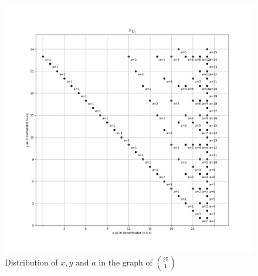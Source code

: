 \documentclass[10pt, twoside]{article}
\newcommand*{\Combination}[2]{\binom{#1}{#2}}%
\begin{document}
\begin{figure}[ph!]
	\includegraphics[width=\linewidth]{25_1_alone.png}
	\caption{Distribution of $x,y \text{ and } a$ in the graph of $\Combination{25}{1}$}
	\label{25_C_1_example}
\end{figure}
\end{document}

